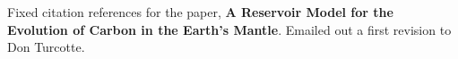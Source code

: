 Fixed citation references for the paper, \textbf{A Reservoir Model for the Evolution of Carbon in the Earth's Mantle}. Emailed out a first revision to Don Turcotte. 
